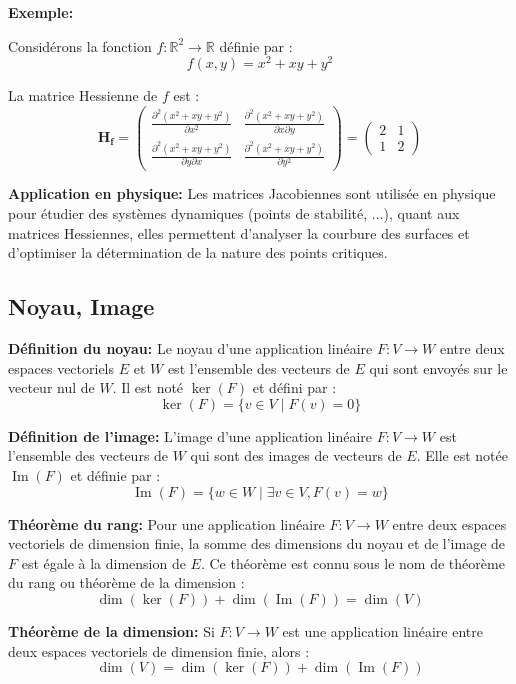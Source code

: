 \textbf{Exemple:}

Considérons la fonction $f : \mathbb{R}^2 \to \mathbb{R}$ définie par :
\[
f(x, y) = x^2 + xy + y^2
\]

La matrice Hessienne de $f$ est :
\[
\mathbf{H_f} = \begin{pmatrix}
\frac{\partial^2 (x^2 + xy + y^2)}{\partial x^2} & \frac{\partial^2 (x^2 + xy + y^2)}{\partial x \partial y} \\
\frac{\partial^2 (x^2 + xy + y^2)}{\partial y \partial x} & \frac{\partial^2 (x^2 + xy + y^2)}{\partial y^2}
\end{pmatrix}
= \begin{pmatrix}
2 & 1 \\
1 & 2
\end{pmatrix}
\]

\textbf{Application en physique:}
Les matrices Jacobiennes sont utilisée en physique pour étudier des systèmes dynamiques (points de stabilité, ...), quant aux matrices Hessiennes, elles permettent d'analyser la courbure des surfaces et d'optimiser la détermination de la nature des points critiques. 


\subsection{Noyau, Image}

\textbf{Définition du noyau:}
Le noyau d'une application linéaire $F : V \to W$ entre deux espaces vectoriels $E$ et $W$ est l'ensemble des vecteurs de $E$ qui sont envoyés sur le vecteur nul de $W$. Il est noté $\ker(F)$ et défini par :
\[
\ker(F) = \{ v \in V \mid F(v) = 0 \}
\]

\textbf{Définition de l'image:}
L'image d'une application linéaire $F : V \to W$ est l'ensemble des vecteurs de $W$ qui sont des images de vecteurs de $E$. Elle est notée $\operatorname{Im}(F)$ et définie par :
\[
\operatorname{Im}(F) = \{ w \in W \mid \exists v \in V, F(v) = w \}
\]

\textbf{Théorème du rang:}
Pour une application linéaire $F : V \to W$ entre deux espaces vectoriels de dimension finie, la somme des dimensions du noyau et de l'image de $F$ est égale à la dimension de $E$. Ce théorème est connu sous le nom de théorème du rang ou théorème de la dimension :
\[
\dim(\ker(F)) + \dim(\operatorname{Im}(F)) = \dim(V)
\]

\textbf{Théorème de la dimension:}
Si $F : V \to W$ est une application linéaire entre deux espaces vectoriels de dimension finie, alors :
\[
\dim(V) = \dim(\ker(F)) + \dim(\operatorname{Im}(F))
\]

